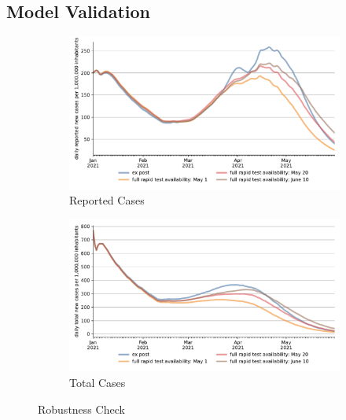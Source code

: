 \subsection{Model Validation}
\label{subsec:model_validation}



\begin{figure}[ht] %
  \centering
  \begin{subfigure}[b]{.49\textwidth}
    \centering
    \includegraphics[width=0.9 \textwidth]{figures/results/figures/scenario_comparisons/robustness_check/full_new_known_case}
    \caption{Reported Cases}
    \label{fig:robustness_check_new_known_case}
  \end{subfigure}%
  \hfill
  \begin{subfigure}[b]{.49\textwidth}
    \centering
    \includegraphics[width=0.9 \textwidth]{figures/results/figures/scenario_comparisons/robustness_check/full_newly_infected}
    \caption{Total Cases}
    \label{fig:robustness_check_newly_infected}
  \end{subfigure}
  \caption{Robustness Check}
  \label{fig:robustness_check_detailed}
\end{figure}

